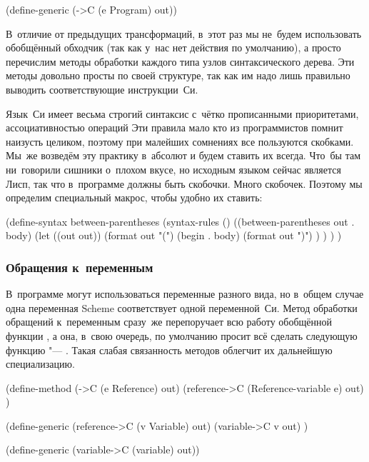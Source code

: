 \begin{code:lisp}
(define-generic (->C (e Program) out))
\end{code:lisp}

В~отличие от предыдущих трансформаций, в~этот раз мы не~будем использовать
обобщённый обходчик (так как у~нас нет действия по умолчанию), а просто
перечислим методы обработки каждого типа узлов синтаксического дерева. Эти
методы довольно просты по своей структуре, так как им надо лишь правильно
выводить соответствующие инструкции~Си.

Язык~Си имеет весьма строгий синтаксис с~чётко прописанными приоритетами,
ассоциативностью операций {\itd} Эти правила мало кто из программистов помнит
наизусть целиком, поэтому при малейших сомнениях все пользуются скобками. Мы~же
возведём эту практику в~абсолют и будем ставить их всегда. Что~бы там
ни~говорили сишники о~плохом вкусе, но исходным языком сейчас является Лисп,
так что в~программе должны быть скобочки. Много скобочек. Поэтому мы определим
специальный макрос, чтобы удобно их ставить:

\begin{code:lisp}
(define-syntax between-parentheses
  (syntax-rules ()
    ((between-parentheses out . body)
     (let ((out out))
       (format out "(")
       (begin . body)
       (format out ")") ) ) ) )
\end{code:lisp}


\subsubsection{Обращения к~переменным}\label{cc/gen/exprs/sssect:refs}

В~программе могут использоваться переменные разного вида, но в~общем случае
одна переменная Scheme соответствует одной переменной~Си. Метод обработки
обращений к~переменным сразу~же перепоручает всю работу обобщённой функции
, а она, в~свою очередь, по умолчанию просит всё сделать
следующую функцию "--- . Такая слабая связанность методов
облегчит их дальнейшую специализацию.

\begin{code:lisp}
(define-method (->C (e Reference) out)
  (reference->C (Reference-variable e) out) )

(define-generic (reference->C (v Variable) out)
  (variable->C v out) )

(define-generic (variable->C (variable) out))
\end{code:lisp}

